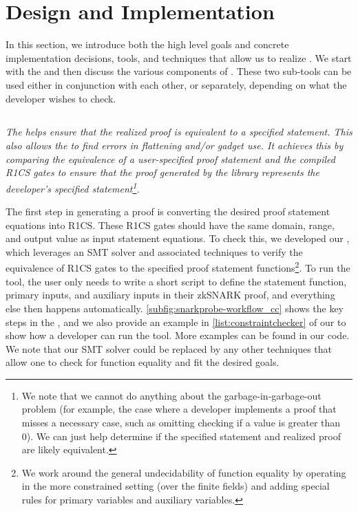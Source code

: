 \section{Design and Implementation}
\label{sec:snarkprobe-design}

In this section, we introduce both the high level goals and concrete implementation decisions, tools, and techniques that allow us to realize \snarkprobe.  We start with the \ConstraintChecker and then discuss the various components of \SnarkFuzzer.  These two sub-tools can be used either in conjunction with each other, or separately, depending on what the developer wishes to check.

\subsection{\ConstraintChecker}
\label{subsec:snarkprobe-constraintchecker}

 \emph{The \ConstraintChecker helps ensure that the realized proof is equivalent to a specified statement.  This also allows the \ConstraintChecker to find errors in flattening and/or gadget use.  It achieves this by comparing the equivalence of a user-specified proof statement and the compiled R1CS gates to ensure that the proof generated by the library represents the developer's specified statement\footnote{We note that we cannot do anything about the garbage-in-garbage-out problem (for example, the case where a developer implements a proof that misses a necessary case, such as omitting checking if a value is greater than 0).  We can just help determine if the specified statement and realized proof are likely equivalent.}.}

%
The first step in generating a \zksnark proof is converting the desired proof statement equations into R1CS.  These R1CS gates should have the same domain, range, and output value as input statement equations.
To check this, we developed our \ConstraintChecker, which leverages an SMT solver and associated techniques to verify the equivalence of R1CS gates to the specified proof statement functions\footnote{We work around the general undecidability of function equality by operating in the more constrained setting (over the finite fields) and adding special rules for primary variables and auxiliary variables.}. To run the tool, the user only needs to write a short script to define the statement function, primary inputs, and auxiliary inputs in their zkSNARK proof, and everything else then happens automatically. \autoref{subfig:snarkprobe-workflow_cc} shows the key steps in the \ConstraintChecker, and we also provide an example in \autoref{list:constraintchecker} of our \ConstraintChecker to show how a developer can run the tool. More examples can be found in our code. We note that our SMT solver could be replaced by any other techniques that allow one to check for function equality and fit the desired goals.

